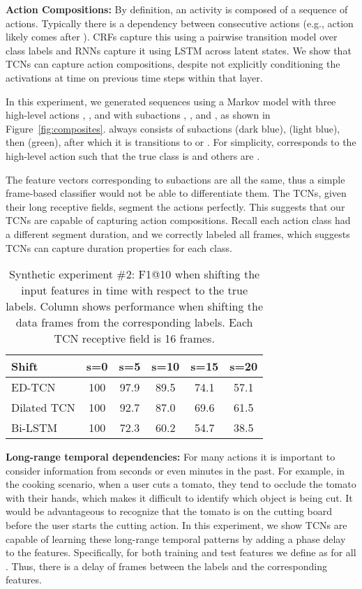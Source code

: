 \documentclass[10pt,twocolumn,letterpaper]{article}
\newcommand{\fakesubsection}[1]{\smallskip\noindent\textbf{#1:}}
\begin{document}
\fakesubsection{Action Compositions}
By definition, an activity is composed of a sequence of actions. Typically there is a dependency between consecutive actions (e.g., action  likely comes after ).
CRFs capture this using a pairwise transition model over class labels and RNNs capture it using LSTM across latent states. 
We show that TCNs can capture action compositions, despite not explicitly conditioning the activations at time  on previous time steps within that layer. 



In this experiment, we generated sequences using a Markov model with three high-level actions , , and  with subactions , , and , as shown in Figure~\ref{fig:composites}.  always consists of subactions  (dark blue),  (light blue), then  (green), after which it is transitions to  or .
For simplicity,  corresponds to the high-level action  such that the true class is  and others are . 





The feature vectors corresponding to subactions  are all the same, thus a simple frame-based classifier would not be able to differentiate them. The TCNs, given their long receptive fields, segment the actions perfectly. 
This suggests that our TCNs are capable of capturing action compositions. 
Recall each action class had a different segment duration, and we correctly labeled all frames, which suggests TCNs can capture duration properties for each class. 


\begin{table}
	\centering
	\begin{tabular}{|l|c|c|c|c|c|}
		\hline
		Shift & s=0 & s=5 & s=10 & s=15 & s=20\\
		\hline		
ED-TCN  & 100 & 97.9 & 89.5 & 74.1 & 57.1 \\
Dilated TCN & 100 & 92.7 & 87.0 & 69.6 & 61.5\\
Bi-LSTM & 100 & 72.3 &  60.2 & 54.7 & 38.5\\ 
		\hline
	\end{tabular}
	\label{tab:shift_results}	
	\caption{Synthetic experiment \#2: F1@10 when shifting the input features in time with respect to the true labels. 
Column shows performance when shifting the data  frames from the corresponding labels. Each TCN receptive field is 16 frames.}
\end{table}


\fakesubsection{Long-range temporal dependencies}
For many actions it is important to consider information from seconds or even minutes in the past.
For example, in the cooking scenario, when a user cuts a tomato, they tend to occlude the tomato with their hands, which makes it difficult to identify which object is being cut. It would be advantageous to recognize that the tomato is on the cutting board before the user starts the cutting action. 
In this experiment, we show TCNs are capable of learning these long-range temporal patterns by adding a phase delay to the features. Specifically, for both training and test features we define  as  for all . Thus, there is a delay of  frames between the labels and the corresponding features. 
\end{document}
